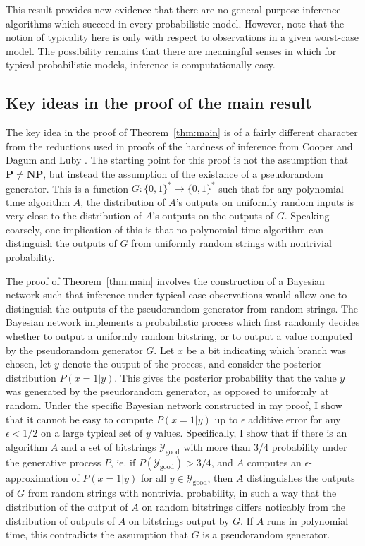 \documentclass{article}
\renewcommand{\P}{\mathbf{P}}
\newcommand{\NP}{\mathbf{NP}}
\def \Ygood{\mathcal{Y}_\text{good}}
\theoremstyle{definition}
\theoremstyle{remark}
\begin{document}
This result provides new evidence that there are no general-purpose inference algorithms which succeed in every probabilistic model.
However, note that the notion of typicality here is only with respect to observations in a given worst-case model.
The possibility remains that there are meaningful senses in which for typical probabilistic models, inference is computationally easy.

\subsection{Key ideas in the proof of the main result}
The key idea in the proof of Theorem~\ref{thm:main} is of a fairly different character from the reductions used in proofs of the hardness of inference from Cooper \cite{cooper1990} and Dagum and Luby \cite{dagum1993}.
The starting point for this proof is not the assumption that $\P \neq \NP$, but instead the assumption of the existance of a pseudorandom generator.
This is a function $G: \{0, 1\}^* \to \{0, 1\}^*$ such that for any polynomial-time algorithm $A$, the distribution of $A$'s outputs on uniformly random inputs is very close to the distribution of $A$'s outputs on the outputs of $G$.
Speaking coarsely, one implication of this is that no polynomial-time algorithm can distinguish the outputs of $G$ from uniformly random strings with nontrivial probability.

The proof of Theorem~\ref{thm:main} involves the construction of a Bayesian network such that inference under typical case observations would allow one to distinguish the outputs of the pseudorandom generator from random strings.
The Bayesian network implements a probabilistic process which first randomly decides whether to output a uniformly random bitstring, or to output a value computed by the pseudorandom generator $G$.
Let $x$ be a bit indicating which branch was chosen,
let $y$ denote the output of the process,
and consider the posterior distribution $P(x = 1 | y)$.
This gives the posterior probability that the value $y$ was generated by the pseudorandom generator, as opposed to uniformly at random.
Under the specific Bayesian network constructed in my proof, I show that it cannot be easy to compute $P(x = 1 | y)$ up to $\epsilon$ additive error for any $\epsilon < 1/2$ on a large typical set of $y$ values.
Specifically, I show that if there is an algorithm $A$ and a set of bitstrings
$\Ygood$ with more than 3/4 probability under the generative process $P$,
ie. if 
$P(\Ygood) > 3/4$,
and $A$ computes an $\epsilon$-approximation of $P(x = 1 | y)$
for all $y \in \Ygood$,
then $A$ distinguishes the outputs of $G$ from random strings with nontrivial probability, in such a way that the distribution of the output of $A$ on random bitstrings differs noticably from the distribution of outputs of $A$ on bitstrings output by $G$.
If $A$ runs in polynomial time, this contradicts the assumption that $G$ is a pseudorandom generator.
\end{document}
